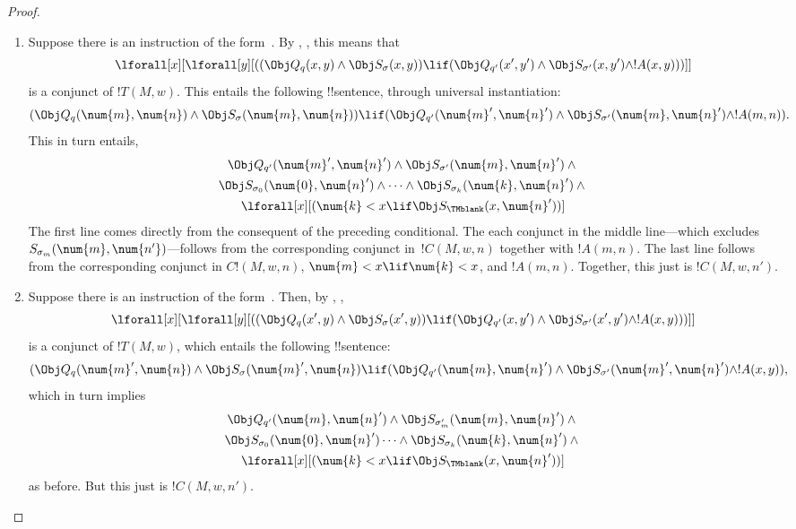 \documentclass[../../../include/open-logic-section]{subfiles}
\begin{document}
\begin{proof}
\begin{enumerate} 
\item Suppose there is an instruction of the form~.
  By , , this means that
\[ 
\lforall[x][\lforall[y][((\Obj Q_{q}(x,
y) \land \Obj S_\sigma(x, y)) \lif (\Obj Q_{q'}(x',
y') \land \Obj S_{\sigma'}(x, y') \land !A(x, y)))]]
\] 
is a conjunct of $!T(M,w)$. This entails the following
!!{sentence}, through universal instantiation: 
\[ 
(\Obj Q_{q}(\num{m}, \num{n}) \land \Obj S_{\sigma}(\num{m}, \num{n}))
\lif (\Obj Q_{q'}(\num{m}', \num{n}') \land \Obj S_{\sigma'}(\num{m},
\num{n}') \land !A(m, n)).
\]
This in turn entails,
\begin{multline*}
\Obj Q_{q'}(\num{m}', \num{n}') \land \Obj S_{\sigma'}(\num{m},
\num{n}') \land {}\\
\Obj S_{\sigma_0}(\num{0}, \num{n}') \land \dots \land
\Obj S_{\sigma_k}(\num{k}, \num{n}') \land {}\\
\lforall[x][(\num{k} < x
  \lif \Obj S_\TMblank(x, \num{n}'))]
\end{multline*}
The first line comes directly from the consequent of the preceding
conditional. The each conjunct in the middle line---which excludes
$S_{\sigma_m}(\num{m},\num{n'})$---follows from the corresponding
conjunct in~$!C(M, w, n)$ together with $!A(m, n)$. The last line
follows from the corresponding conjunct in $C!(M, w, n)$, $\num{m} < x
\lif \num{k} < x$, and $!A(m, n)$.  Together, this just is $!C(M, w, n')$.

\item Suppose there is an instruction of the form~.
  Then, by , ,
\[
\lforall[x][\lforall[y][((\Obj Q_{q}(x', y) \land \Obj
S_{\sigma}(x', y)) \lif (\Obj Q_{q'}(x, y') \land \Obj
S_{\sigma'}(x', y') \land !A(x, y)))]] 
\] 
is a conjunct of $!T(M,w)$, which entails the following !!{sentence}: 
\[ 
(\Obj Q_{q}(\num{m}', \num{n}) \land \Obj S_{\sigma}(\num{m}', \num{n})
\lif (\Obj Q_{q'}(\num{m}, \num{n}') \land \Obj S_{\sigma'}(\num{m}',
\num{n}') \land !A(x, y)),
\]
which in turn implies
\begin{multline*}
  \Obj Q_{q'}(\num{m}, \num{n}') \land \Obj S_{\sigma'_m}(\num{m},
  \num{n}') \land {}\\
  \Obj S_{\sigma_0}(\num{0}, \num{n}')\dots \land
  \Obj S_{\sigma_k}(\num{k}, \num{n}')  \land {} \\
  \lforall[x][(\num{k} < x
  \lif \Obj S_\TMblank(x, \num{n}'))]
\end{multline*}
as before. But this just is $!C(M, w, n')$.


\end{enumerate}
\end{proof}
\end{document}
